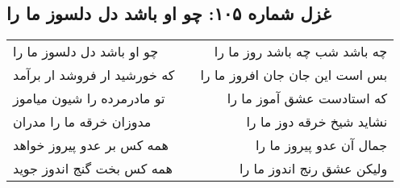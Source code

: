 \begin{center}
\section*{غزل شماره ۱۰۵: چو او باشد دل دلسوز ما را}
\label{sec:0105}
\begin{longtable}{l p{0.5cm} r}
چو او باشد دل دلسوز ما را
&&
چه باشد شب چه باشد روز ما را
\\
که خورشید ار فروشد ار برآمد
&&
بس است این جان جان افروز ما را
\\
تو مادرمرده را شیون میاموز
&&
که استادست عشق آموز ما را
\\
مدوزان خرقه ما را مدران
&&
نشاید شیخ خرقه دوز ما را
\\
همه کس بر عدو پیروز خواهد
&&
جمال آن عدو پیروز ما را
\\
همه کس بخت گنج اندوز جوید
&&
ولیکن عشق رنج اندوز ما را
\\
\end{longtable}
\end{center}
